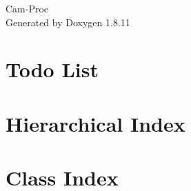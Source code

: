 \documentclass[twoside]{book}
\newcommand{\+}{\discretionary{\mbox{\scriptsize$\hookleftarrow$}}{}{}}
\newcommand{\clearemptydoublepage}{%
  \newpage{\pagestyle{empty}\cleardoublepage}%
}
\begin{document}
\hypersetup{pageanchor=false,
             bookmarksnumbered=true,
             pdfencoding=unicode
            }
\begin{titlepage}
\vspace*{7cm}
\begin{center}%
{\Large Cam-\/\+Proc }\\
\vspace*{1cm}
{\large Generated by Doxygen 1.8.11}\\
\end{center}
\end{titlepage}
\clearemptydoublepage
\tableofcontents
\clearemptydoublepage
{}
\hypersetup{pageanchor=true}

\chapter{Todo List}
\label{todo}
\hypertarget{todo}{}

\chapter{Hierarchical Index}

\chapter{Class Index}

\end{document}
